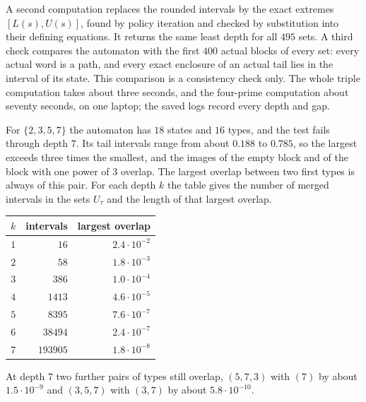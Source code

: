A second computation replaces the rounded intervals by the exact extremes
$[L(s),U(s)]$, found by policy iteration and checked by substitution into
their defining equations.  It returns the same least depth for all $495$
sets.  A third check compares the automaton with the first $400$ actual
blocks of every set: every actual word is a path, and every exact enclosure
of an actual tail lies in the interval of its state.  This comparison is a
consistency check only.  The whole triple computation takes about three
seconds, and the four-prime computation about seventy seconds, on one
laptop; the saved logs record every depth and gap.

For $\{2,3,5,7\}$ the automaton has $18$ states and $16$ types, and the test
fails through depth $7$.  Its tail intervals range from about $0.188$ to
$0.785$, so the largest exceeds three times the smallest, and the images of
the empty block and of the block with one power of $3$ overlap.  The largest
overlap between two first types is always of this pair.  For each depth $k$
the table gives the number of merged intervals in the sets $U_\tau$ and the
length of that largest overlap.
\begin{center}\small
\begin{tabular}{@{}rrr@{}}
\hline
$k$ & intervals & largest overlap\\\hline
$1$ & $16$ & $2.4\cdot10^{-2}$\\
$2$ & $58$ & $1.8\cdot10^{-3}$\\
$3$ & $386$ & $1.0\cdot10^{-4}$\\
$4$ & $1413$ & $4.6\cdot10^{-5}$\\
$5$ & $8395$ & $7.6\cdot10^{-7}$\\
$6$ & $38494$ & $2.4\cdot10^{-7}$\\
$7$ & $193905$ & $1.8\cdot10^{-8}$\\\hline
\end{tabular}
\end{center}
At depth $7$ two further pairs of types still overlap, $(5,7,3)$ with $(7)$
by about $1.5\cdot10^{-9}$ and $(3,5,7)$ with $(3,7)$ by about
$5.8\cdot10^{-10}$.

